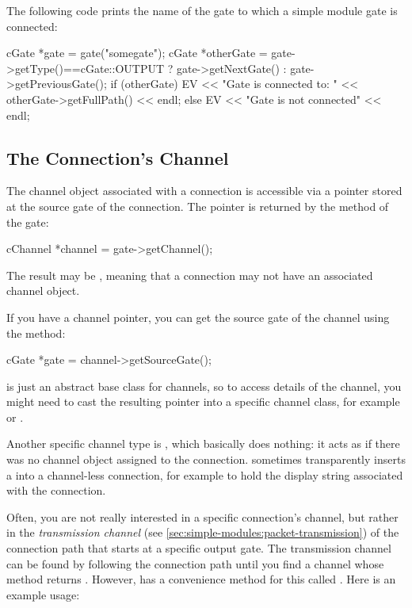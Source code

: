 The following code prints the name of the gate to which a simple module gate is
connected:

\begin{cpp}
cGate *gate = gate("somegate");
cGate *otherGate = gate->getType()==cGate::OUTPUT ? gate->getNextGate() :
                                                    gate->getPreviousGate();
if (otherGate)
  EV << "Gate is connected to: " << otherGate->getFullPath() << endl;
else
  EV << "Gate is not connected" << endl;
\end{cpp}


\subsection{The Connection's Channel}
\label{sec:simple-modules:connections-channel}

The channel object associated with a connection is accessible via
a pointer stored at the source gate of the connection. The pointer
is returned by the  method of the gate:

\begin{cpp}
cChannel *channel = gate->getChannel();
\end{cpp}

The result may be , meaning that a connection may not have
an associated channel object.

If you have a channel pointer, you can get the source gate of the channel
using the  method:

\begin{cpp}
cGate *gate = channel->getSourceGate();
\end{cpp}

 is just an abstract base class for channels, so
to access details of the channel, you might need to cast the resulting
pointer into a specific channel class, for example 
or .

Another specific channel type is , which basically
does nothing: it acts as if there was no channel object assigned to the
connection. {\opp} sometimes transparently inserts a 
into a channel-less connection, for example to hold the display string
associated with the connection.

Often, you are not really interested in a specific connection's channel, but
rather in the \textit{transmission channel} (see
\ref{sec:simple-modules:packet-transmission}) of the connection path that
starts at a specific output gate. The transmission channel can be found by
following the connection path until you find a channel whose
 method returns . However,
 has a convenience method for this called
. Here is an example usage:

